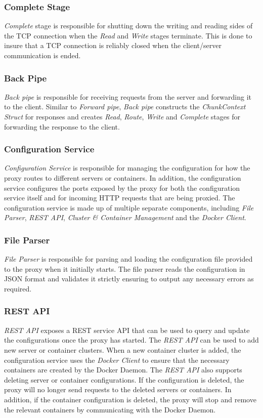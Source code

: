 \documentclass[a4paper,11pt,twoside]{report}
\begin{document}
\subsubsection*{Complete Stage}
\textit{Complete} stage is responsible for shutting down the writing and reading sides of the TCP connection when the \textit{Read} and \textit{Write} stages terminate. This is done to insure that a TCP connection is reliably closed when the client/server communication is ended. 

\subsubsection*{Back Pipe}
\textit{Back pipe} is responsible for receiving requests from the server and forwarding it to the client. Similar to \textit{Forward pipe}, \textit{Back pipe} constructs the \textit{ChunkContext Struct} for responses and creates \textit{Read}, \textit{Route}, \textit{Write} and \textit{Complete} stages for forwarding the response to the client.

\subsubsection*{Configuration Service}
\textit{Configuration Service} is responsible for managing the configuration for how the proxy routes to different servers or containers.  In addition, the configuration service configures the ports exposed by the proxy for both the configuration service itself and for incoming HTTP requests that are being proxied.  The configuration service is made up of multiple separate components, including \textit{File Parser}, \textit{REST API}, \textit{Cluster \& Container Management} and the \textit{Docker Client}.

\subsubsection*{File Parser}
\textit{File Parser} is responsible for parsing and loading the configuration file provided to the proxy when it initially starts.  The file parser reads the configuration in JSON format and validates it strictly ensuring to output any necessary errors as required.

\subsubsection*{REST API}
\textit{REST API} exposes a REST service API that can be used to query and update the configurations once the proxy has started.  The \textit{REST API} can be used to add new server or container clusters.  When a new container cluster is added, the configuration service uses the \textit{Docker Client} to ensure that the necessary containers are created by the Docker Daemon.  The \textit{REST API} also supports deleting server or container configurations. If the configuration is deleted, the proxy will no longer send requests to the deleted servers or containers.  In addition, if the container configuration is deleted, the proxy will stop and remove the relevant containers by communicating with the Docker Daemon.
\end{document}
